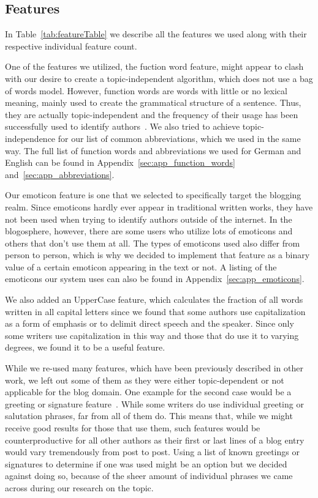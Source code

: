 \subsection{Features}
\label{sec:impl_features}

In Table~\ref{tab:featureTable} we describe all the features we used along with their respective individual feature count.


One of the features we utilized, the fuction word feature, might appear to clash with our desire to create a topic-independent algorithm, which does not use a bag of words model.
However, function words are words with little or no lexical meaning, mainly used to create the grammatical structure of a sentence.
Thus, they are actually topic-independent and the frequency of their usage has been successfully used to identify authors~\cite{mosteller1962applied}.
We also tried to achieve topic-independence for our list of common abbreviations, which we used in the same way.
The full list of function words and abbreviations we used for German and English can be found in Appendix~\ref{sec:app_function_words} and~\ref{sec:app_abbreviations}.


Our emoticon feature is one that we selected to specifically target the blogging realm.
Since emoticons hardly ever appear in traditional written works, they have not been used when trying to identify authors outside of the internet.
In the blogosphere, however, there are some users who utilize lots of emoticons and others that don't use them at all.
The types of emoticons used also differ from person to person, which is why we decided to implement that feature as a binary value of a certain emoticon appearing in the text or not.
A listing of the emoticons our system uses can also be found in Appendix~\ref{sec:app_emoticons}.


We also added an UpperCase feature, which calculates the fraction of all words written in all capital letters since we found that some authors use capitalization as a form of emphasis or to delimit direct speech and the speaker.
Since only some writers use capitalization in this way and those that do use it to varying degrees, we found it to be a useful feature.


While we re-used many features, which have been previously described in other work, we left out some of them as they were either topic-dependent or not applicable for the blog domain.
One example for the second case would be a greeting or signature feature~\cite{de2001mining}.
While some writers do use individual greeting or salutation phrases, far from all of them do.
This means that, while we might receive good results for those that use them, such features would be counterproductive for all other authors as their first or last lines of a blog entry would vary tremendously from post to post.
Using a list of known greetings or signatures to determine if one was used might be an option but we decided against doing so, because of the sheer amount of individual phrases we came across during our research on the topic.


